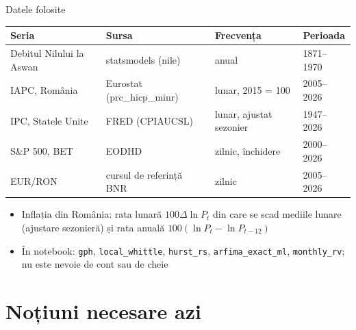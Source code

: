 \begin{frame}{Datele folosite}
\itemsize{\small}
\begin{center}
\footnotesize
\begin{tabular}{llll}
\toprule
\textbf{Seria} & \textbf{Sursa} & \textbf{Frecvența} & \textbf{Perioada} \\
\midrule
Debitul Nilului la Aswan & statsmodels (nile) & anual & 1871--1970 \\
IAPC, România & Eurostat (prc\_hicp\_minr) & lunar, 2015 = 100 & 2005--2026 \\
IPC, Statele Unite & FRED (CPIAUCSL) & lunar, ajustat sezonier & 1947--2026 \\
S\&P 500, BET & EODHD & zilnic, închidere & 2000--2026 \\
EUR/RON & cursul de referință BNR & zilnic & 2005--2026 \\
\bottomrule
\end{tabular}
\end{center}
\begin{itemize}
    \item Inflația din România: rata lunară $100\Delta\ln P_t$ din care se scad mediile lunare (ajustare sezonieră) și rata anuală $100(\ln P_t - \ln P_{t-12})$
    \item În notebook: \texttt{gph}, \texttt{local\_whittle}, \texttt{hurst\_rs}, \texttt{arfima\_exact\_ml}, \texttt{monthly\_rv}; nu este nevoie de cont sau de cheie
\end{itemize}
\end{frame}


\section{Noțiuni necesare azi}

